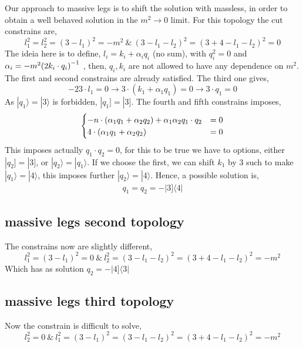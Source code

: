 Our approach to massive legs is to shift the solution with massless, in order to obtain a well behaved solution in the 
$m^2\rightarrow0$ limit. For this topology the cut constrains are,
\[l_1^2=l_2^2=(3-l_1)^2=-m^2\ \&\ (3-l_1-l_2)^2=(3+4-l_1-l_2)^2=0\]
The ideia here is to define, $l_i=k_i+\alpha_i q_i$ (no sum), with $q_i^2=0$ and $\alpha_i=-m^2\qty(2k_i\cdot q_i)^{-1}$ , 
then, $q_i,k_i$ are not allowed to have any dependence on $m^2$. The first and second constrains are already satisfied. The third one gives,
\[-23\cdot l_1=0\rightarrow 3\cdot(k_1+\alpha_1 q_1)=0\rightarrow 3\cdot q_1=0\]
As $|q_1\rangle = |3\rangle$ is forbidden, $|q_1]=|3]$. The fourth and fifth constrains imposes,
\begin{align*}
    \begin{cases}
        -n\cdot\qty(\alpha_1 q_1+\alpha_2 q_2)+\alpha_1\alpha_2 q_1\cdot q_2&=0\\
        4\cdot \qty(\alpha_1 q_1+\alpha_2 q_2)&=0
    \end{cases}
\end{align*}
This imposes actually $q_1\cdot q_2=0$, for this to be true we have to options, either $|q_2]=|3]$, or $|q_2\rangle=|q_1\rangle$. If we choose the first, we can shift $k_1$ by $3$ such to 
make $|q_1\rangle=|4\rangle$, this imposes further $|q_2\rangle=|4\rangle$. Hence, a possible solution is,
\begin{align*}
    q_1=q_2=-|3]\langle 4|
\end{align*}

\subsection{massive legs second topology}

The constrains now are slightly different,
\[l_1^2=(3-l_1)^2=0\ \&\ l^2_2=(3-l_1-l_2)^2=(3+4-l_1-l_2)^2=-m^2\]
Which has as solution $q_2=-|4]\langle3|$

\subsection{massive legs third topology}

Now the constrain is difficult to solve,
\[l_2^2=0\ \&\ l^2_1=(3-l_1)^2=(3-l_1-l_2)^2=(3+4-l_1-l_2)^2=-m^2\]